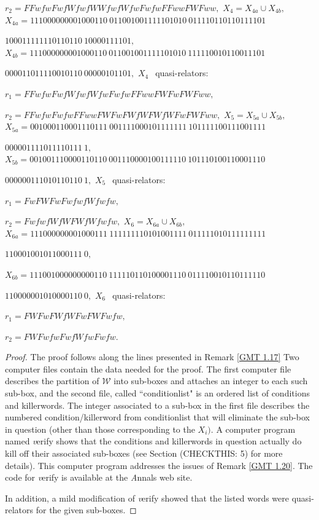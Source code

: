 \begin{theorem}
$r_2 = FFwfwFwfWfwfWWfwfWfwFwfwFFwwFWFww,$
\noindent $X_4 = X_{4a} \cup X_{4b},$
\noindent $X_{4a} = 
111000000001000110\ 
011001001111101010\ 
011110110110111101$\hfill

\hfill  
$100011111110110110\ 
10000111101,$
\noindent $X_{4b} = 
111000000001000110\ 
011001001111101010\ 
111110010110011101$\hfill

\hfill  
$000011011110010110\ 
00000101101,$
\noindent $X_4\ \ $ quasi\/{\textrm -}\/relators\/{\textrm :}

$r_1 = FFwfwFwfWfwfWfwFwfwFFwwFWFwFWFww,$

$r_2 = FFwfwFwfwFFwwFWFwFWfWFWfWFwFWFww,$
\noindent $X_5 = X_{5a} \cup X_{5b},$
\noindent $X_{5a} = 
001000110001110111\ 
001111000101111111\ 
101111100111001111$\hfill

\hfill 
$000001111011110111\ 1,$
\noindent  $X_{5b} = 
001001110000110110\ 
001110000100111110\ 
101110100110001110$\hfill

\hfill  
$000000111010110110\ 1,$
\vglue4pt
\noindent $X_5\ \ $ quasi\/{\textrm -}\/relators\/{\textrm :}

$r_1 = FwFWFwFwfwfWfwfw,$

$r_2 = FwfwfWfWFWfWfwfw,$
\vfil
\noindent $X_6 = X_{6a} \cup X_{6b},$
\vfil
\noindent $X_{6a} = 
111000000001000111\ 
111111110101001111\ 
011111010111111111$\hfill

\hfill  
$110001001011000111\ 0,$

\noindent $X_{6b} = 
111001000000000110\ 
111110110100001110\ 
011110010110111110$\hfill

\hfill  
$110000001010000110\ 0,$
\vglue4pt
\noindent $X_6\ \ $ quasi\/{\textrm -}\/relators\/{\textrm :}\/

$r_1 = FWFwFWfWFwFWFwfw,$

$r_2 = FWFwfwFwfWfwFwfw.$
\end{theorem}

 
\begin{proof}{}  
The proof follows along the lines presented in
Remark \ref{GMT 1.17}
Two computer files contain the data needed for the proof.   
The first computer file describes the partition of ${\mathcal W}$ into
sub-boxes and attaches an integer to each such sub-box, 
and the second file, called ``conditionlist" is an ordered list of conditions and killerwords.
The integer associated to a sub-box in the first file describes the numbered condition/killerword from   conditionlist that will eliminate the sub-box
in question (other than those corresponding to the $X_i).$ A computer program named {\textit verify} shows
that the conditions and killerwords in question actually do kill off their associated sub-boxes (see
	Section (CHECKTHIS: 5)  %
	for more details).  This computer
program addresses the issues of Remark \ref{GMT 1.20}.  The code for {\textit
verify} is available at the {\textit Annals} web site. 

In addition, a mild modification of {\textit verify} showed that the listed words were quasi-relators for the given sub-boxes. 
\end{proof}

